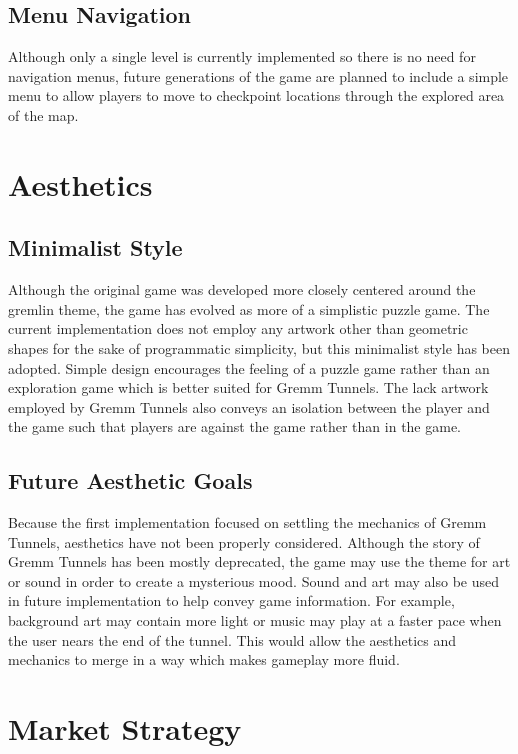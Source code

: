 \documentclass{scrreprt}
\begin{document}
		\section{Menu Navigation}
			Although only a single level is currently implemented so there is no need for navigation menus, future generations of the game are planned to include a simple menu to allow players to move to checkpoint locations through the explored area of the map. 
		
	\chapter{Aesthetics}
	
		\section{Minimalist Style}
			Although the original game was developed more closely centered around the gremlin theme, the game has evolved as more of a simplistic puzzle game. The current implementation does not employ any artwork other than geometric shapes for the sake of programmatic simplicity, but this minimalist style has been adopted. Simple design encourages the feeling of a puzzle game rather than an exploration game which is better suited for Gremm Tunnels. The lack artwork employed by Gremm Tunnels also conveys an isolation between the player and the game such that players are against the game rather than in the game. 
		
		\section{Future Aesthetic Goals}
			Because the first implementation focused on settling the mechanics of Gremm Tunnels, aesthetics have not been properly considered. Although the story of Gremm Tunnels has been mostly deprecated, the game may use the theme for art or sound in order to create a mysterious mood. Sound and art may also be used in future implementation to help convey game information. For example, background art may contain more light or music may play at a faster pace when the user nears the end of the tunnel. This would allow the aesthetics and mechanics to merge in a way which makes gameplay more fluid.
		
	\chapter{Market Strategy}
		
\end{document}
